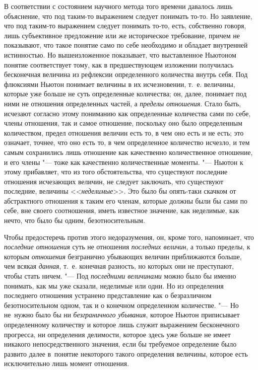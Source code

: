 В соответствии с состоянием научного метода того времени давалось лишь
объяснение, что под таким-то выражением следует понимать то-то. Но заявление,
что под таким-то выражением следует понимать то-то, есть, собственно говоря,
лишь субъективное предложение или же историческое требование, причем не
показывают, что такое понятие само по себе необходимо и обладает внутренней
истинностью. Но вышеизложенное показывает, что выставленное Ньютоном понятие
соответствует тому, как в предшествующем изложении получилась бесконечная
величина из рефлексии определенного количества внутрь себя. Под флюксиями
Ньютон понимает величины в их исчезновении, т.~е. величины, которые уже больше
не суть определенные количества; он, далее, понимает под ними не отношения
определенных частей, а {\em пределы отношения}. Стало быть, исчезают согласно
этому пониманию как определенные количества сами по себе, члены отношения, так
и самое отношение, поскольку оно было определенным количеством, предел
отношения величин есть то, в чем оно есть и не есть; это означает, точнее, что
оно есть то, в чем определенное количество исчезло, и тем самым сохранились
лишь отношение как качественно количественное отношение, и его члены "--- тоже
как качественно количественные моменты. "--- Ньютон к этому прибавляет, что из
того обстоятельства, что существуют последние отношения исчезающих величин, не
следует заключать, что существуют последние, величины <<{\em неделимые}>>. Это
было бы опять-таки скачком от абстрактного отношения к таким его членам,
которые должны были бы сами по себе, вне своего соотношения, иметь известное
значение, как неделимые, как нечто, что было бы одним, безотносительным.

Чтобы предостеречь против этого недоразумения, он, кроме того, напоминает, что
{\em последние отношения} суть не отношения {\em последних величин}, а только
пределы, к которым {\em отношения} безгранично убывающих величин приближаются
больше, чем всякая {\em данная}, т.~е. конечная разность, но которых они не
преступают, чтобы стать ничем. "--- Под {\em последними величинами} можно было
бы именно понимать, как мы уже сказали, неделимые или одни. Но из определения
последнего отношения устранено представление как о безразличном
безотносительном одном, так и о конечном определенном количестве. "--- Но
не~нужно было бы ни {\em безграничного убывания}, которое Ньютон приписывает
определенному количеству и которое лишь служит выражением бесконечного
прогресса, ни определения делимости, которое здесь уже больше не имеет никакого
непосредственного значения, если бы требуемое определение было развито далее
в~понятие некоторого такого определения величины, которое есть исключительно
лишь момент отношения.

